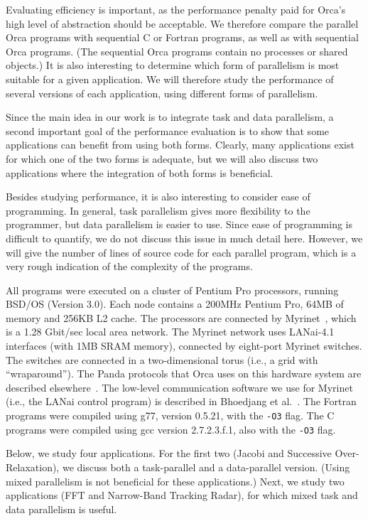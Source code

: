 \documentclass{acmtrans2e}
\begin{document}
Evaluating efficiency is important, as the performance penalty paid
for Orca's high level of abstraction should be acceptable. 
We therefore compare the parallel Orca programs with
sequential C or Fortran programs, as well as with sequential Orca programs.
(The sequential Orca programs contain no processes or shared objects.)
It is also interesting to determine which form of parallelism is
most suitable for a given application. We will therefore study the
performance of several versions of each application, using different
forms of parallelism.

Since the main idea in our work is to integrate task and data parallelism,
a second important goal of the performance evaluation is to
show that some applications can benefit from using both forms.
Clearly, many applications exist for which one of the
two forms is adequate, but we will also discuss
two applications where the integration of both forms is beneficial.

Besides studying performance, it is also interesting to consider
ease of programming. In general, task parallelism gives more flexibility
to the programmer, but data parallelism is easier to use.
Since ease of programming is difficult to quantify, we do not discuss
this issue in much detail here. However, we will give the number of lines
of source code for each parallel program, which is
a very rough indication of the complexity of the programs.

All programs were executed on a cluster
of Pentium Pro processors, running BSD/OS (Version 3.0).
Each node contains a 200MHz Pentium Pro,
64MB of memory and 256KB L2 cache.
The processors are connected by Myrinet~\cite{boden95},
which is a 1.28 Gbit/sec local area network.
The Myrinet network uses LANai-4.1 interfaces (with 1MB SRAM memory),
connected by eight-port Myrinet switches.
The switches are connected in a two-dimensional torus
(i.e., a grid with ``wraparound'').
The Panda protocols that Orca uses
on this hardware system are described elsewhere~\cite{Bal:1998}.
The low-level communication software we use for Myrinet (i.e., the
LANai control program) is described in Bhoedjang et al.~\citeyear{bhoedjang98}.
The Fortran programs were compiled using g77, version 0.5.21, with
the \verb+-O3+ flag.
The C programs were compiled using gcc version 2.7.2.3.f.1, also with
the \verb+-O3+ flag.

Below, we study four applications. For the first two
(Jacobi and Successive Over-Relaxation),
we discuss both a task-parallel and a data-parallel version.
(Using mixed parallelism is not beneficial for these applications.)
Next, we study two applications (FFT and Narrow-Band Tracking Radar),
for which mixed task and data parallelism is useful.
\end{document}
